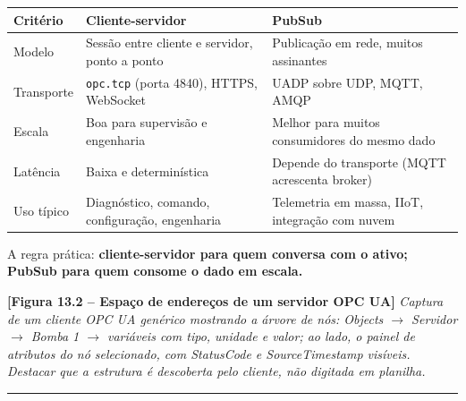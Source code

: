 \begin{longtable}[]{@{}
  >{\raggedright\arraybackslash}p{}
  >{\raggedright\arraybackslash}p{}
  >{\raggedright\arraybackslash}p{}@{}}
\toprule\noalign{}
\begin{minipage}[b]{\linewidth}\raggedright
Critério
\end{minipage} & \begin{minipage}[b]{\linewidth}\raggedright
Cliente-servidor
\end{minipage} & \begin{minipage}[b]{\linewidth}\raggedright
PubSub
\end{minipage} \\
\midrule\noalign{}
\endhead
\bottomrule\noalign{}
\endlastfoot
Modelo & Sessão entre cliente e servidor, ponto a ponto & Publicação em rede, muitos assinantes \\
Transporte & \passthrough{\lstinline!opc.tcp!} (porta 4840), HTTPS, WebSocket & UADP sobre UDP, MQTT, AMQP \\
Escala & Boa para supervisão e engenharia & Melhor para muitos consumidores do mesmo dado \\
Latência & Baixa e determinística & Depende do transporte (MQTT acrescenta broker) \\
Uso típico & Diagnóstico, comando, configuração, engenharia & Telemetria em massa, IIoT, integração com nuvem \\
\end{longtable}

A regra prática: \textbf{cliente-servidor para quem conversa com o ativo; PubSub para quem consome o dado em escala.}

\begin{caixafigura}

\textbf{{[}Figura 13.2 -- Espaço de endereços de um servidor OPC UA{]}}
\emph{Captura de um cliente OPC UA genérico mostrando a árvore de nós: Objects \ensuremath{\rightarrow} Servidor \ensuremath{\rightarrow} Bomba 1 \ensuremath{\rightarrow} variáveis com tipo, unidade e valor; ao lado, o painel de atributos do nó selecionado, com StatusCode e SourceTimestamp visíveis. Destacar que a estrutura é descoberta pelo cliente, não digitada em planilha.}

\end{caixafigura}

\begin{center}\rule{0.5\linewidth}{0.5pt}\end{center}

